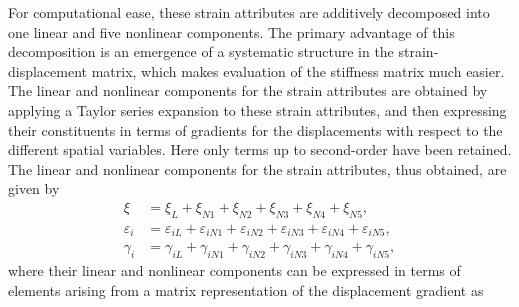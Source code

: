 For computational ease, these strain attributes are additively decomposed into one linear and five nonlinear components. The primary advantage of this decomposition is an emergence of a systematic structure in the strain-displacement matrix, which makes evaluation of the stiffness matrix much easier.  The linear and nonlinear components for the strain attributes are obtained by applying a Taylor series expansion to these strain attributes, and then expressing their constituents in terms of gradients for the displacements with respect to the different spatial variables.  Here only terms up to second-order have been retained. The linear and nonlinear components for the strain attributes, thus obtained, are given by
\begin{subequations}
    \begin{align}
       \xi & =   \xi_{L} +    \xi_{N1} +    \xi_{N2} +    \xi_{N3} +    \xi_{N4} +    \xi_{N5} , \\
       \varepsilon_{i} & =    \varepsilon_{iL} +    \varepsilon_{iN1} +    \varepsilon_{iN2} +    \varepsilon_{iN3} +    \varepsilon_{iN4} +    \varepsilon_{iN5} , \\
      \gamma_{i} & =    \gamma_{iL} +    \gamma_{iN1} +    \gamma_{iN2} +    \gamma_{iN3} +    \gamma_{iN4} +    \gamma_{iN5} ,
    \end{align}
    \label{totalvirtualstrain}
\end{subequations}
where their linear and nonlinear components can be expressed in terms of elements arising from a matrix representation of the displacement gradient as
